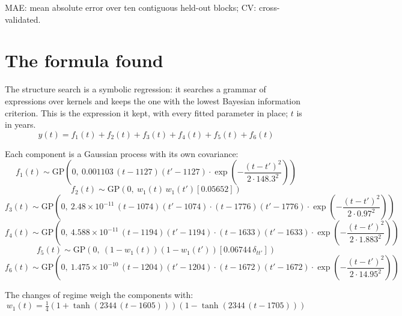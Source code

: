 \documentclass[11pt,a4paper]{article}
\begin{document}
MAE: mean absolute error over ten contiguous held-out blocks; CV: cross-validated.

\section*{The formula found}

The structure search is a symbolic regression: it searches a grammar of expressions over kernels and keeps the one with the lowest Bayesian information criterion. This is the expression it kept, with every fitted parameter in place; $t$ is in years.
\begin{dmath*}
y(t) = f_{1}(t) + f_{2}(t) + f_{3}(t) + f_{4}(t) + f_{5}(t) + f_{6}(t)
\end{dmath*}

Each component is a Gaussian process with its own covariance:
\begin{dmath*}
f_{1}(t) \sim \mathrm{GP}\!\left(0,\ 0.001103\,(t - 1127)(t' - 1127) \cdot \exp\!\left(-\frac{(t - t')^2}{2 \cdot 148.3^2}\right)\right)
\end{dmath*}
\begin{dmath*}
f_{2}(t) \sim \mathrm{GP}\!\left(0,\ w_{1}(t)\,w_{1}(t')\left[0.05652\right]\right)
\end{dmath*}
\begin{dmath*}
f_{3}(t) \sim \mathrm{GP}\!\left(0,\ 2.48 \times 10^{-11}\,(t - 1074)(t' - 1074) \cdot (t - 1776)(t' - 1776) \cdot \exp\!\left(-\frac{(t - t')^2}{2 \cdot 0.97^2}\right)\right)
\end{dmath*}
\begin{dmath*}
f_{4}(t) \sim \mathrm{GP}\!\left(0,\ 4.588 \times 10^{-11}\,(t - 1194)(t' - 1194) \cdot (t - 1633)(t' - 1633) \cdot \exp\!\left(-\frac{(t - t')^2}{2 \cdot 1.883^2}\right)\right)
\end{dmath*}
\begin{dmath*}
f_{5}(t) \sim \mathrm{GP}\!\left(0,\ (1 - w_{1}(t))(1 - w_{1}(t'))\left[0.06744\,\delta_{t t'}\right]\right)
\end{dmath*}
\begin{dmath*}
f_{6}(t) \sim \mathrm{GP}\!\left(0,\ 1.475 \times 10^{-10}\,(t - 1204)(t' - 1204) \cdot (t - 1672)(t' - 1672) \cdot \exp\!\left(-\frac{(t - t')^2}{2 \cdot 14.95^2}\right)\right)
\end{dmath*}

The changes of regime weigh the components with:
\begin{dmath*}
w_{1}(t) = \tfrac{1}{4}\left(1 + \tanh\left(2344\,(t - 1605)\right)\right)\left(1 - \tanh\left(2344\,(t - 1705)\right)\right)
\end{dmath*}
\end{document}

